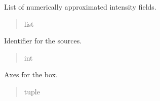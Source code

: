\documentclass[letterpaper,10pt,english]{sphinxmanual}
\begin{document}
\begin{fulllineitems}
\begin{fulllineitems}
\label{\detokenize{source/Box:Box.Box.numerically_approximated_intensity_fields}}
\pysigstartsignatures
\pysigline
{}
\pysigstopsignatures
\sphinxAtStartPar
List of numerically approximated intensity fields.
\begin{quote}\begin{description}
\sphinxAtStartPar
list

\end{description}\end{quote}

\end{fulllineitems}


\begin{fulllineitems}
\label{\detokenize{source/Box:Box.Box.source_identifier}}
\pysigstartsignatures
\pysigline
{}
\pysigstopsignatures
\sphinxAtStartPar
Identifier for the sources.
\begin{quote}\begin{description}
\sphinxAtStartPar
int

\end{description}\end{quote}

\end{fulllineitems}


\begin{fulllineitems}
\label{\detokenize{source/Box:Box.Box.axes}}
\pysigstartsignatures
\pysigline
{}
\pysigstopsignatures
\sphinxAtStartPar
Axes for the box.
\begin{quote}\begin{description}
\sphinxAtStartPar
tuple

\end{description}\end{quote}

\end{fulllineitems}



\end{fulllineitems}
\end{document}
